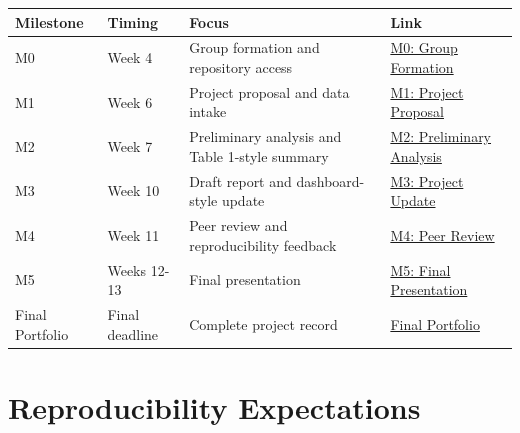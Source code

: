 \documentclass[
  letterpaper,
  DIV=11,
  numbers=noendperiod,
  oneside]{scrreprt}
\begin{document}
\begin{longtable}[]{@{}
  >{\raggedright\arraybackslash}p{}
  >{\raggedright\arraybackslash}p{}
  >{\raggedright\arraybackslash}p{}
  >{\raggedright\arraybackslash}p{}@{}}
\toprule\noalign{}
\begin{minipage}[b]{\linewidth}\raggedright
Milestone
\end{minipage} & \begin{minipage}[b]{\linewidth}\raggedright
Timing
\end{minipage} & \begin{minipage}[b]{\linewidth}\raggedright
Focus
\end{minipage} & \begin{minipage}[b]{\linewidth}\raggedright
Link
\end{minipage} \\
\midrule\noalign{}
\endhead
\bottomrule\noalign{}
\endlastfoot
M0 & Week 4 & Group formation and repository access &
\href{m0-group-formation/README.md}{M0: Group Formation} \\
M1 & Week 6 & Project proposal and data intake &
\href{m1-proposal/README.md}{M1: Project Proposal} \\
M2 & Week 7 & Preliminary analysis and Table 1-style summary &
\href{m2-preliminary-analysis/README.md}{M2: Preliminary Analysis} \\
M3 & Week 10 & Draft report and dashboard-style update &
\href{m3-project-update/README.md}{M3: Project Update} \\
M4 & Week 11 & Peer review and reproducibility feedback &
\href{m4-peer-review/README.md}{M4: Peer Review} \\
M5 & Weeks 12-13 & Final presentation &
\href{m5-presentation/README.md}{M5: Final Presentation} \\
Final Portfolio & Final deadline & Complete project record &
\href{final-portfolio/README.md}{Final Portfolio} \\
\end{longtable}

\section*{Reproducibility
Expectations}\label{reproducibility-expectations-1}
\end{document}
